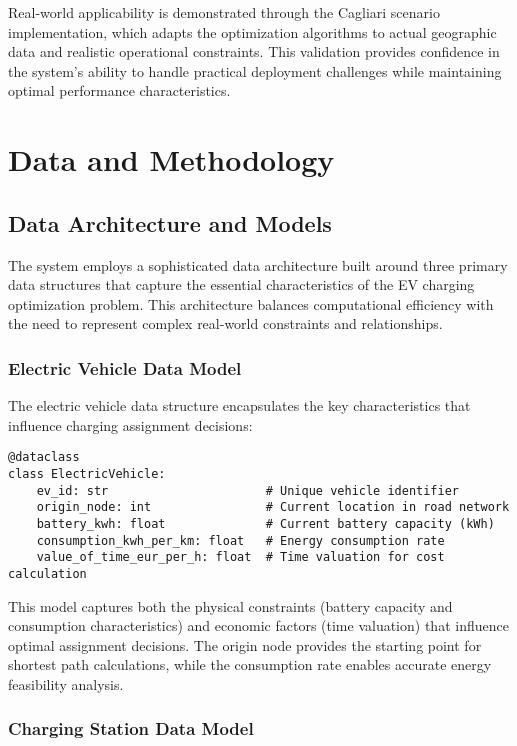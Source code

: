 \documentclass[12pt,a4paper]{article}
\begin{document}
Real-world applicability is demonstrated through the Cagliari scenario implementation, which adapts the optimization algorithms to actual geographic data and realistic operational constraints. This validation provides confidence in the system's ability to handle practical deployment challenges while maintaining optimal performance characteristics.

\section{Data and Methodology}

\subsection{Data Architecture and Models}

The system employs a sophisticated data architecture built around three primary data structures that capture the essential characteristics of the EV charging optimization problem. This architecture balances computational efficiency with the need to represent complex real-world constraints and relationships.

\subsubsection{Electric Vehicle Data Model}

The electric vehicle data structure encapsulates the key characteristics that influence charging assignment decisions:

\begin{lstlisting}[caption=Electric Vehicle Data Structure]
@dataclass
class ElectricVehicle:
    ev_id: str                      # Unique vehicle identifier
    origin_node: int                # Current location in road network
    battery_kwh: float              # Current battery capacity (kWh)
    consumption_kwh_per_km: float   # Energy consumption rate
    value_of_time_eur_per_h: float  # Time valuation for cost calculation
\end{lstlisting}

This model captures both the physical constraints (battery capacity and consumption characteristics) and economic factors (time valuation) that influence optimal assignment decisions. The origin node provides the starting point for shortest path calculations, while the consumption rate enables accurate energy feasibility analysis.

\subsubsection{Charging Station Data Model}
\end{document}
